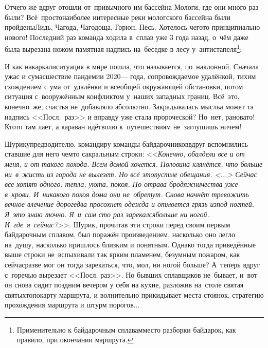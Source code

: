 {{\renewcommand*{\thefootnote}{\fnsymbol{footnote}}
\setcounter{footnote}{0}
Отчего же вдруг отошли от~привычного им бассейна Мологи, где они много раз были? Всё~просто\mdash наиболее интересные реки мологского бассейна были пройдены\mdash Лидь, Чагода, Чагодоща, Горюн, Песь. Хотелось чего\sdash то принципиально нового! Последний раз команда ходила в~сплав уже 3 года назад, о~чём даже была вырезана ножом памятная надпись на~беседке в лесу у~антистапеля\footnote{Применительно к байдарочным сплавам\mdash место разборки байдарок, как правило, при окончании маршрута.}: %

\vspace{4mm}
{\centering\Huge{}}

\newpage
И как накаркали\mdash ситуация в мире пошла, что называется, по~наклонной. Сначала ужас и сумасшествие пандемии 2020\thinspace\nobreakdash--- года, сопровождаемое удалёнкой, тихим схождением с ума от~удалёнки и всеобщей окружающей обстановки, потом ситуация с~вооружённым конфликтом у~наших западных границ. Всё~это, конечно~же, счастья не~добавляло абсолютно. Закрадывалась мысль\mdash а может та надпись <<Посл.~раз>> и вправду уже стала пророческой? Но~нет, рановато! Кто\sdash то там лает, а караван идёт\mdash волю к~путешествиям не~заглушишь ничем!

Шурику\mdash предводителю, командиру команды байдарочников\mdash вдруг вспомнились ставшие для него чем\sdash то сакральным строки: <<\textit{Конечно, обалдели все и от меня, и от такого похода. Всем домой хочется. Половина клянётся, что больше ни~в~жисть из города не вылезет. Но всё это\mdash пустые обещания. <...> Сейчас все хотят одного: тепла, уюта, покоя. Но отрава бродяжничества уже в~крови. И~никакого покоя дома они не~обретут. Снова начнёт тревожить вечное влечение дорог\mdash едва просохнет одежда и отмоется грязь из\sdash под ногтей. Я~это знаю точно. Я~и~сам сто раз зарекался\mdash больше ни ногой. И~где~я~сейчас?}>>\cite{ГеографГлобусПропил}. Шурик, прочитав эти строки перед своим первым байдарочным сплавом, был поражён произведением, насколько оно легло на~душу, насколько пришлось близким и понятным. Однако тогда приведённые выше строки не~вспыхивали так ярким пламенем, безумным пожаром, как сейчас\mdash разве мог он тогда зарекаться, что, мол, ни ногой больше? А~теперь вдруг с~горечью вырезает <<Посл. раз>>. Но бывших сплавщиков не~бывает, и~вот он снова сидит поздним вечером у себя на кухне, разложив на~столе святая святых\mdash топокарту маршрута, и волнительно прикидывает места стоянок, стратегию прохождения маршрута и штурм порогов$\ldots$ 

}}
